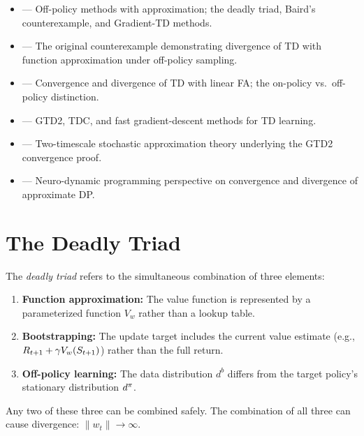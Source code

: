\documentclass[11pt,a4paper]{article}
\begin{document}
\begin{itemize}[leftmargin=2em]
  \item \citet[Chapter 11]{suttonbarto2018} --- Off-policy methods
    with approximation; the deadly triad, Baird's counterexample,
    and Gradient-TD methods.
  \item \citet{baird1995} --- The original counterexample demonstrating
    divergence of TD with function approximation under off-policy
    sampling.
  \item \citet{tsitsiklis1997} --- Convergence and divergence of TD
    with linear FA; the on-policy vs.\ off-policy distinction.
  \item \citet{sutton2009} --- GTD2, TDC, and fast gradient-descent
    methods for TD learning.
  \item \citet{borkar2008} --- Two-timescale stochastic approximation
    theory underlying the GTD2 convergence proof.
  \item \citet[Chapter 6]{bertsekas1996} --- Neuro-dynamic programming
    perspective on convergence and divergence of approximate DP.
\end{itemize}

\section{The Deadly Triad}
\label{sec:triad}

\begin{definition}
\label{def:deadly_triad}
The \emph{deadly triad} refers to the simultaneous combination of
three elements:
\begin{enumerate}
  \item \textbf{Function approximation:} The value function is
    represented by a parameterized function $V_w$ rather than a
    lookup table.
  \item \textbf{Bootstrapping:} The update target includes the
    current value estimate (e.g., $R_{t+1} + \gamma V_w(S_{t+1})$)
    rather than the full return.
  \item \textbf{Off-policy learning:} The data distribution
    $d^b$ differs from the target policy's stationary distribution
    $d^\pi$.
\end{enumerate}
Any two of these three can be combined safely. The combination of
all three can cause divergence: $\|w_t\| \to \infty$.
\end{definition}
\end{document}

